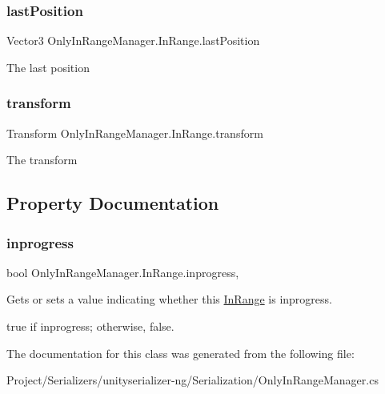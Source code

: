 \subsubsection{\texorpdfstring{last\+Position}{lastPosition}}
{\footnotesize\ttfamily Vector3 Only\+In\+Range\+Manager.\+In\+Range.\+last\+Position}



The last position 

\mbox{\label{class_only_in_range_manager_1_1_in_range_ab5c9e0831b39bb97780c2d86b308af6a}} 
\subsubsection{\texorpdfstring{transform}{transform}}
{\footnotesize\ttfamily Transform Only\+In\+Range\+Manager.\+In\+Range.\+transform}



The transform 



\subsection{Property Documentation}
\mbox{\label{class_only_in_range_manager_1_1_in_range_a4938a7b5f149e6ae13e1cd471341c57a}} 
\subsubsection{\texorpdfstring{inprogress}{inprogress}}
{\footnotesize\ttfamily bool Only\+In\+Range\+Manager.\+In\+Range.\+inprogress\hspace{0.3cm}{\ttfamily [get]}, {\ttfamily [set]}}



Gets or sets a value indicating whether this \hyperlink{class_only_in_range_manager_1_1_in_range}{In\+Range} is inprogress. 

{\ttfamily true} if inprogress; otherwise, {\ttfamily false}.

The documentation for this class was generated from the following file\+:\begin{DoxyCompactItemize}
\item 
Project/\+Serializers/unityserializer-\/ng/\+Serialization/Only\+In\+Range\+Manager.\+cs\end{DoxyCompactItemize}
